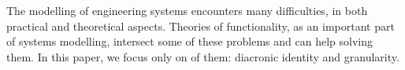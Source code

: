 \documentclass[
]{ceurart}
\begin{document}
The modelling of engineering systems encounters many difficulties, in both practical and theoretical aspects. 
Theories of functionality, as an important part of systems modelling, intersect some of these problems and can help solving them. In this paper, we focus only on  of them: diacronic identity and granularity.
\end{document}
